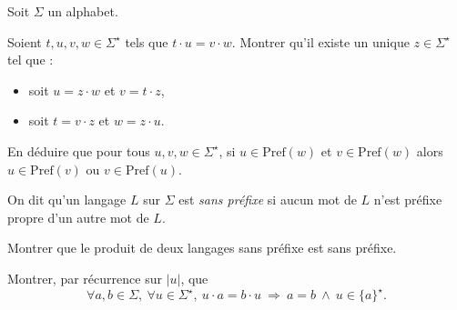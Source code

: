 
\begingroup

\begin{exercice}\label{exo:introduction/languages/challenge}

  Soit $\Sigma$ un alphabet. 
  \begin{questions}
  \item Soient $t,u,v,w \in \Sigma^\star$ tels que $t \cdot u = v \cdot w$. 
    Montrer qu'il existe un unique $z \in \Sigma^\star$ tel que :
    \begin{itemize}
    \item soit $u = z \cdot w$ et $v = t \cdot z$,
    \item soit $t = v \cdot z$ et $w = z \cdot u$.
    \end{itemize}
  \item En déduire que pour tous $u,v,w \in \Sigma^\star$,  
    si $u \in \mathrm{Pref}(w)$ et $v \in \mathrm{Pref}(w)$ alors  
    $u \in \mathrm{Pref}(v)$ ou \linebreak $v \in \mathrm{Pref}(u)$.
  \end{questions}

  On dit qu'un langage $L$ sur $\Sigma$ est \emph{sans préfixe}
  si aucun mot de $L$ n'est préfixe propre d'un autre mot de $L$. 
  \begin{questions}
  \item Montrer que le produit de deux langages sans préfixe est sans préfixe. 
  \item Montrer, par récurrence sur $|u|$, que
    $$\forall a,b \in \Sigma,\ \forall u \in \Sigma^\star,\ u\cdot a = b\cdot u \ \Rightarrow\ a = b\ \land\ u \in \{a\}^\star.$$
  \end{questions}

\end{exercice}

